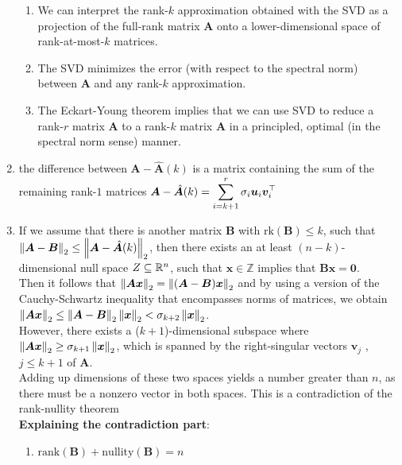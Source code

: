 \begin{enumerate}
\begin{enumerate}
        \item We can interpret the rank-$k$ approximation obtained with the SVD as a projection of the full-rank matrix $\bm{A}$ onto a lower-dimensional space of rank-at-most-$k$ matrices.
        \hfill \cite{mfml/book/mml/Deisenroth-Faisal-Ong}

        \item The SVD minimizes the error (with respect to the spectral norm) between $\bm{A}$ and any rank-$k$ approximation.
        \hfill \cite{mfml/book/mml/Deisenroth-Faisal-Ong}

        \item The Eckart-Young theorem implies that we can use SVD to reduce a rank-$r$ matrix $\bm{A}$ to a rank-$k$ matrix $\hat{\bm{A}}$ in a principled, optimal (in the spectral norm sense) manner.
        \hfill \cite{mfml/book/mml/Deisenroth-Faisal-Ong}
    \end{enumerate}

    \item the difference between $\bm{A} - \hat{\bm{A}}(k)$ is a matrix containing the sum of the remaining rank-$1$ matrices
    $
        \bm{A} - \hat{\bm{A}}(k)
        = \displaystyle\sum_{i=k+1}^r \sigma_i \bm{u}_i \bm{v}_i^\top
    $
    \hfill \cite{mfml/book/mml/Deisenroth-Faisal-Ong}

    \item If we assume that there is another matrix $\bm{B}$ with $\text{rk}(\bm{B}) \leq k$, such that
    $
        \left\| \bm{A} - \bm{B} \right\|_2 \leq \left\| \bm{A} - \hat{\bm{A}}(k) \right\|_2
    $,
    then there exists an at least $(n - k)$-dimensional null space $Z \subseteq \mathbb{R}^n$, such that $\bm{x} \in \mathbb{Z}$ implies that $\bm{Bx} = \bm{0}$.
    \hfill \cite{mfml/book/mml/Deisenroth-Faisal-Ong}
    \\
    Then it follows that
    $
        \left\| \bm{Ax} \right\|_2 = \left\| (\bm{A} - \bm{B})\bm{x} \right\|_2
    $
    and by using a version of the Cauchy-Schwartz inequality that encompasses norms of matrices, we obtain
    $
        \left\| \bm{Ax} \right\|_2
        \leq \left\| \bm{A} - \bm{B} \right\|_2 \left\| \bm{x} \right\|_2
        < \sigma_{k+2} \left\| \bm{x} \right\|_2
    $.
    \hfill \cite{mfml/book/mml/Deisenroth-Faisal-Ong}
    \\
    However, there exists a ($k + 1$)-dimensional subspace where $\left\| \bm{Ax} \right\|_2 \geq \sigma_{k+1} \left\| \bm{x} \right\|_2$, which is spanned by the right-singular vectors $\bm{v}_j$ , $j \leq k + 1$ of $\bm{A}$.
    \\
    Adding up dimensions of these two spaces yields a number greater than $n$, as there must be a nonzero vector in both spaces. This is a contradiction of the rank-nullity theorem
    \hfill \cite{mfml/book/mml/Deisenroth-Faisal-Ong}
    \vspace{0.5cm}
    \\
    \textbf{Explaining the contradiction part}:
    \hfill \cite{common/online/chatgpt}
    \begin{enumerate}
        \item $\text{rank}(\bm{B})+\text{nullity}(\bm{B})=n$


\end{enumerate}
\end{enumerate}
